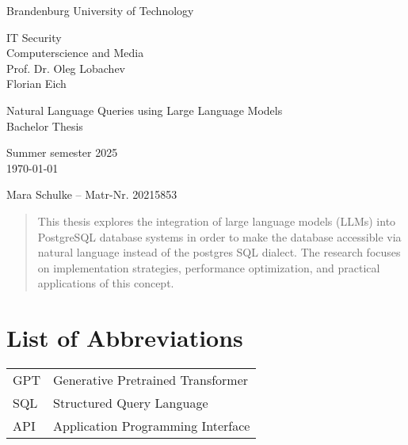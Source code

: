 \documentclass{article}
\begin{document}
\begin{titlepage}
    \begin{center}
        \begin{Large}
            Brandenburg University of Technology \\[1em]
        \end{Large}
        IT Security \\
        Computerscience and Media \\
        Prof. Dr. Oleg Lobachev \\
        Florian Eich
    \end{center}

    \vfill

    \begin{center}
        \Large{Natural Language Queries using Large Language Models}\\[0.5em]
        \large{Bachelor Thesis}\\[1em]
        
        \begin{normalsize}
            Summer semester 2025\\[0.25em]
            \today
        \end{normalsize}
    \end{center}

    \vfill

    \begin{center}
        Mara Schulke – Matr-Nr. 20215853
    \end{center}
\end{titlepage}

\begin{abstract}
This thesis explores the integration of large language models (LLMs) into PostgreSQL database systems in order
to make the database accessible via natural language instead of the postgres SQL dialect. The research focuses
on implementation strategies, performance optimization, and practical applications of this concept.
\end{abstract}

\tableofcontents

\listoffigures

\section*{List of Abbreviations}
\begin{tabular}{ll}
GPT & Generative Pretrained Transformer \\
SQL & Structured Query Language \\
API & Application Programming Interface \\
\end{tabular}
\end{document}

